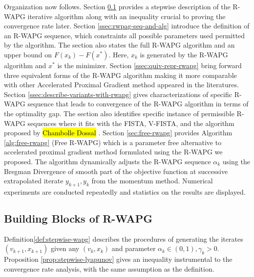 \documentclass[12pt]{article}
\begin{document}
        Organization now follows. 
        Section \ref{ssec:building-block-rwapg} provides a stepwise description of the R-WAPG iterative algorithm along with an inequality crucial to proving the convergence rate later. 
        Section \ref{ssec:rwpag-seq-and-alg} introduce the definition of an R-WAPG sequence, which constraints all possible parameters used permitted by the algorithm.
        The section also states the full R-WAPG algorithm and an upper bound on $F(x_k) - F(x^*)$. 
        Here, $x_k$ is generated by the R-WAPG algorithm and $x^*$ is the minimizer. 
        Section \ref{ssec:quiv-repr-rwapg} bring forward three equivalent forms of the R-WAPG algorithm making it more comparable with other Accelerated Proximal Gradient method appeared in the literatures. 
        Section \ref{ssec:describe-variants-with-rwapg} gives characterizations of specific R-WAPG sequence that leads to convergence of the R-WAPG algorithm in terms of the optimality gap. 
        The section also identifies specific instance of permissible R-WAPG sequences where it fits with the FISTA, V-FISTA, and the algorithm proposed by 
        {\hl{Chambolle Dossal}} \cite{chambolle_convergence_2015}. 
        Section \ref{sec:free-rwapg} provides Algorithm \ref{alg:free-rwapg} (Free R-WAPG) which is a parameter free alternative to accelerated proximal gradient method formulated using the R-WAPG we proposed. 
        The algorithm dynamically adjusts the R-WAPG sequence $\alpha_k$ using the Bregman Divergence of smooth part of the objective function at successive extrapolated iterate $y_{k + 1}, y_k$ from the momentum method. 
        Numerical experiments are conducted repeatedly and statistics on the results are displayed. 


        
    \subsection{Building Blocks of R-WAPG}\label{ssec:building-block-rwapg}
        Definition\ref{def:stepwise-wapg} describes the procedures of generating the iterates $(v_{k + 1}, x_{k + 1})$ given any $(v_k, x_k)$ and parameter $\alpha_k \in (0, 1), \gamma_k > 0$. 
        Proposition \ref{prop:stepwise-lyapunov} gives an inequality instrumental to the convergence rate analysis, with the same assumption as the definition. 
\end{document}
